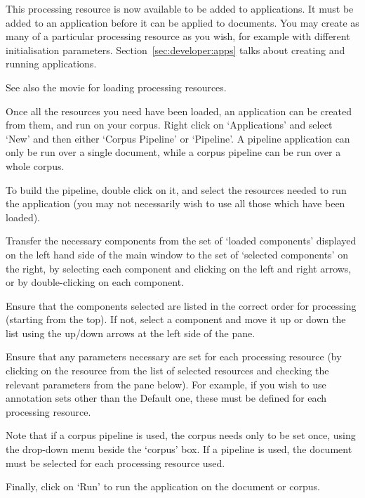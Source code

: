 This processing resource is now available to be added to applications. It must
be added to an application before it can be applied to documents. You may
create as many of a particular processing resource as you wish, for example
with different initialisation parameters. Section~\ref{sec:developer:apps}
talks about creating and running applications.

See also the 
{movie for loading processing resources}.


Once all the resources you need have been loaded, an application can be created
from them, and run on your corpus. Right click on `Applications' and select `New'
and then either `Corpus Pipeline' or `Pipeline'. A pipeline application can only
be run over a single document, while a corpus pipeline can be run over a whole
corpus.

To build the pipeline, double click on it, and select the resources needed
to run the application (you may not necessarily wish to use all those
which have been loaded).

Transfer the necessary components from the set of `loaded components'
displayed on the left hand side of the main window to the set of `selected
components' on the right, by selecting each component and clicking on the
left and right arrows, or by double-clicking on each component.

Ensure that the components selected are listed in the correct order for
processing (starting from the top). If not, select a component and move it
up or down the list using the up/down arrows at the left side of the
pane.

Ensure that any parameters necessary are set for each processing resource
(by clicking on the resource from the list of selected resources and
checking the relevant parameters from the pane below). For example, if you
wish to use annotation sets other than the Default one, these must be
defined for each processing resource.

Note that if a corpus pipeline is used, the corpus needs only to be set
once, using the drop-down menu beside the `corpus' box. If a pipeline is
used, the document must be selected for each processing resource
used.

Finally, click on `Run' to run the application on the document or corpus.

